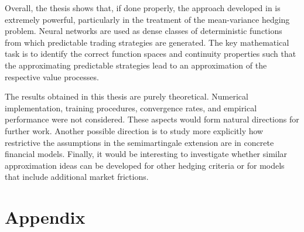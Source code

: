 \documentclass[11pt,a4paper,twoside,openany]{report}
\numberwithin{equation}{section}
\theoremstyle{plain} %
\theoremstyle{definition} %
\theoremstyle{remark} %
\let\parencite\authnumparencite
\begin{document}
Overall, the thesis shows that, if done properly, the approach developed in \parencite{Buehler2018DeepHedging} is extremely powerful, particularly in the treatment of the mean-variance hedging problem. Neural networks are used as dense classes of deterministic functions from which predictable trading strategies are generated. The key mathematical task is to identify the correct function spaces and continuity properties such that the approximating predictable strategies lead to an approximation of the respective value processes.

The results obtained in this thesis are purely theoretical. Numerical implementation, training procedures, convergence rates, and empirical performance were not considered. These aspects would form natural directions for further work. Another possible direction is to study more explicitly how restrictive the assumptions in the semimartingale extension are in concrete financial models. Finally, it would be interesting to investigate whether similar approximation ideas can be developed for other hedging criteria or for models that include additional market frictions.




\clearpage
\printbibliography
\clearpage
\appendix
\chapter{Appendix}
\end{document}
